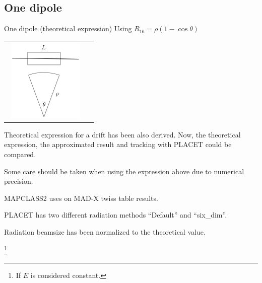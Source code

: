 \documentclass{beamer}
\begin{document}
\subsection{One dipole}
\begin{frame}{One dipole (theoretical expression)}
Using $R_{16}= \rho(1-\cos\theta)$
\begin{tabular}{p{2cm}p{10cm}}
\includegraphics[width=4cm,height=4cm]{Bend.jpg}&\usebox{\radequ}%
\end{tabular}
{\scriptsize
Theoretical expression for a drift has been also derived.
Now, the {\color{marron}theoretical expression}, {\color{green}the approximated result} and {\color{red}tracking with PLACET} could be compared.\par
 Some care should be taken when using {\color{marron}the expression above} due to numerical precision.\par
 MAPCLASS2 uses on MAD-X twiss table results.\par
 PLACET has two different radiation methods ``Default'' and ``six\_dim''.\par
  Radiation beamsize has been normalized to the 
 {\color{marron}theoretical value}. \par
\addtocounter{footnote}{-1}
\footnote{If $E$ is considered constant.}
}

\end{frame}
\end{document}
